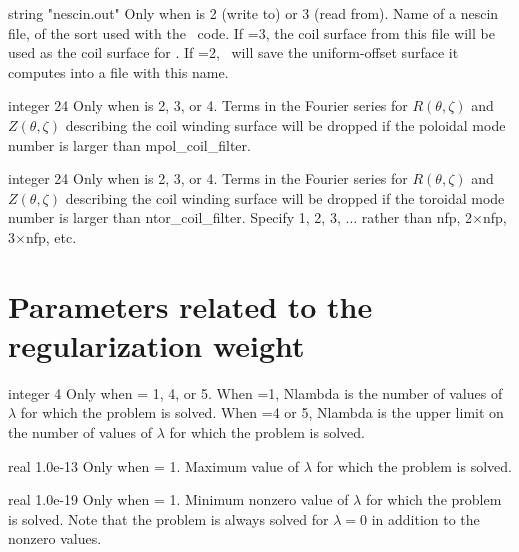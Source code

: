 \myhrule

{string}
{{\ttfamily "nescin.out"}}
{Only when  is 2 (write to) or 3 (read from).}
{Name of a {\ttfamily nescin} file, of the sort used with the \nescoil~code.
If =3, the coil surface from
this file will be used as the coil surface for \regcoil. 
If =2, \regcoil~will save the uniform-offset surface it computes
into a file with this name.}

\myhrule

{integer}
{24}
{Only when  is 2, 3, or 4.}
{Terms in the Fourier series for $R(\theta,\zeta)$ and $Z(\theta,\zeta)$ describing the coil winding surface will be dropped if the poloidal mode number is larger than {\ttfamily mpol\_coil\_filter}.}

\myhrule

{integer}
{24}
{Only when  is 2, 3, or 4.}
{Terms in the Fourier series for $R(\theta,\zeta)$ and $Z(\theta,\zeta)$ describing the coil winding surface will be dropped if the toroidal mode number is larger than {\ttfamily ntor\_coil\_filter}. Specify 1, 2, 3, $\ldots$ rather than {\ttfamily nfp}, 2$\times${\ttfamily nfp}, 3$\times${\ttfamily nfp}, etc.}


\section{Parameters related to the regularization weight}

{integer}
{4}
{Only when  = 1, 4, or 5.}
{When =1, {\ttfamily Nlambda} is the number of values of $\lambda$ for which the problem is solved.
When =4 or 5, {\ttfamily Nlambda} is the upper limit on the number of values of $\lambda$ for which the problem is solved.}

\myhrule

{real}
{1.0e-13}
{Only when  = 1.}
{Maximum value of $\lambda$ for which the problem is solved.}

\myhrule

{real}
{1.0e-19}
{Only when  = 1.}
{Minimum nonzero value of $\lambda$ for which the problem is solved.
Note that the problem is always solved for $\lambda=0$ in addition to
the nonzero values.}

